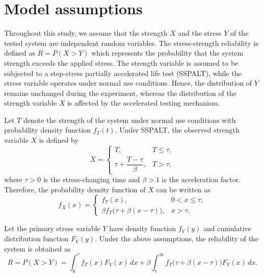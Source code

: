 \documentclass[twoside]{article}
\begin{document}
\section{Model assumptions}
Throughout this study, we assume that the strength $X$ and the stress $Y$ of the tested system are independent random variables. The stress-strength reliability is defined as $ R=P(X>Y) $ which represents the probability that the system strength exceeds the applied stress. The strength variable is assumed to be subjected to a step-stress partially accelerated life test (SSPALT), while the stress variable operates under normal use conditions. Hence, the distribution of $Y$ remains unchanged during the experiment, whereas the distribution of the strength variable $X$ is affected by the accelerated testing mechanism.

Let $T$ denote the strength of the system under normal use conditions with probability density function $f_T(t)$. Under SSPALT, the observed strength variable $X$ is defined by
\begin{equation}\label{eq:sspalt_x}
	X=
	\begin{cases}
		T, & T\leq \tau,\\[2mm]
		\tau+\dfrac{T-\tau}{\beta}, & T>\tau,
	\end{cases}
\end{equation}
where $\tau>0$ is the stress-changing time and $\beta>1$ is the acceleration factor. Therefore, the probability density function of $X$ can be written as
\begin{equation}\label{eq:fx_sspalt}
	f_X(x)=
	\begin{cases}
		f_T(x), & 0<x\leq \tau,\\[2mm]
		\beta f_T\big(\tau+\beta(x-\tau)\big), & x>\tau.
	\end{cases}
\end{equation}

Let the primary stress variable $Y$ have density function $f_Y(y)$ and cumulative distribution function $F_Y(y)$. Under the above assumptions, the reliability of the system is obtained as
\begin{equation}\label{eq:R_general}
	R=P(X>Y)=\int_{0}^{\tau} f_T(x)F_Y(x)\,dx
	+\beta\int_{\tau}^{\infty} f_T\big(\tau+\beta(x-\tau)\big)F_Y(x)\,dx.
\end{equation}
\end{document}
